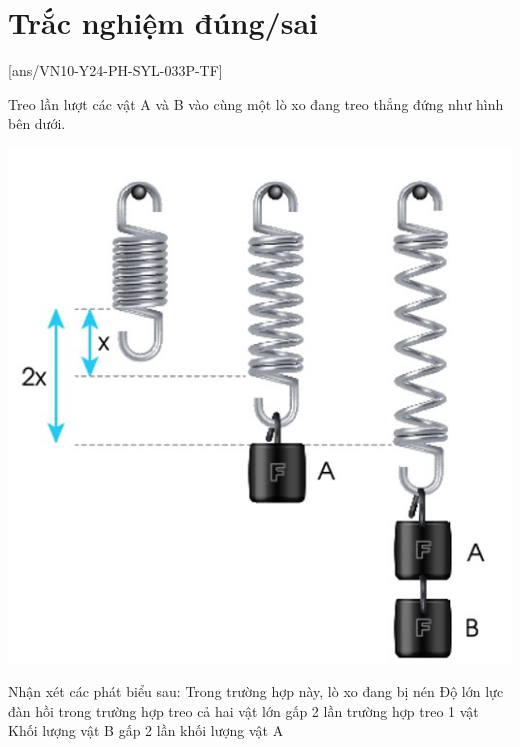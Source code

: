 \section{Trắc nghiệm đúng/sai}
\setcounter{ex}{0}
[ans/VN10-Y24-PH-SYL-033P-TF]
\begin{ex}
	Treo lần lượt các vật A và B vào cùng một lò xo đang treo thẳng đứng như hình bên dưới.
	\begin{center}
		\includegraphics[width=0.3\linewidth]{../figs/VN10-2023-PH-TP033-5}
	\end{center}
	Nhận xét các phát biểu sau:
	{Trong trường hợp này, lò xo đang bị nén}
	{\True Độ lớn lực đàn hồi trong trường hợp treo cả hai vật lớn gấp 2 lần trường hợp treo 1 vật}
	{Khối lượng vật B gấp 2 lần khối lượng vật A}
\end{ex}
